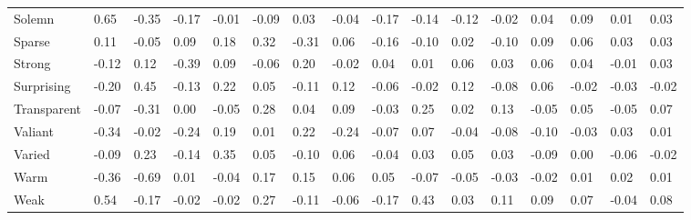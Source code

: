\documentclass[
]{article}
\newenvironment{lltable}{\begin{landscape}\begin{center}\begin{ThreePartTable}}{\end{ThreePartTable}\end{center}\end{landscape}}
\begin{document}
\begin{lltable}
{\begin{longtable}{llllllllllllllll}
Solemn & 0.65 & -0.35 & -0.17 & -0.01 & -0.09 & 0.03 & -0.04 & -0.17 & -0.14 & -0.12 & -0.02 & 0.04 & 0.09 & 0.01 & 0.03\\
Sparse & 0.11 & -0.05 & 0.09 & 0.18 & 0.32 & -0.31 & 0.06 & -0.16 & -0.10 & 0.02 & -0.10 & 0.09 & 0.06 & 0.03 & 0.03\\
Strong & -0.12 & 0.12 & -0.39 & 0.09 & -0.06 & 0.20 & -0.02 & 0.04 & 0.01 & 0.06 & 0.03 & 0.06 & 0.04 & -0.01 & 0.03\\
Surprising & -0.20 & 0.45 & -0.13 & 0.22 & 0.05 & -0.11 & 0.12 & -0.06 & -0.02 & 0.12 & -0.08 & 0.06 & -0.02 & -0.03 & -0.02\\
Transparent & -0.07 & -0.31 & 0.00 & -0.05 & 0.28 & 0.04 & 0.09 & -0.03 & 0.25 & 0.02 & 0.13 & -0.05 & 0.05 & -0.05 & 0.07\\
Valiant & -0.34 & -0.02 & -0.24 & 0.19 & 0.01 & 0.22 & -0.24 & -0.07 & 0.07 & -0.04 & -0.08 & -0.10 & -0.03 & 0.03 & 0.01\\
Varied & -0.09 & 0.23 & -0.14 & 0.35 & 0.05 & -0.10 & 0.06 & -0.04 & 0.03 & 0.05 & 0.03 & -0.09 & 0.00 & -0.06 & -0.02\\
Warm & -0.36 & -0.69 & 0.01 & -0.04 & 0.17 & 0.15 & 0.06 & 0.05 & -0.07 & -0.05 & -0.03 & -0.02 & 0.01 & 0.02 & 0.01\\
Weak & 0.54 & -0.17 & -0.02 & -0.02 & 0.27 & -0.11 & -0.06 & -0.17 & 0.43 & 0.03 & 0.11 & 0.09 & 0.07 & -0.04 & 0.08\\
\bottomrule
\end{longtable}

}

\end{lltable}
\end{document}
